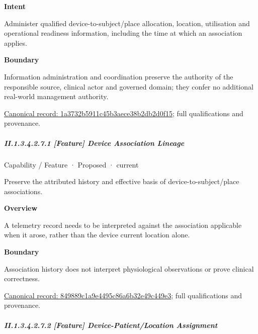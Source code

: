 \textbf{Intent}



Administer qualified device-to-subject/place allocation, location, utilisation and operational readiness information, including the time at which an association applies.



\textbf{Boundary}



Information administration and coordination preserve the authority of the responsible source, clinical actor and governed domain; they confer no additional real-world management authority.


{\footnotesize \href{../../../../../../../continuum/strategy/capability/1a3732b5911c45b3aece38b2db2d0f15.md}{Canonical record: 1a3732b5911c45b3aece38b2db2d0f15}; full qualifications and provenance.}\par
\subparagraph*{II.1.3.4.2.7.1 [Feature] Device Association Lineage}
\label{navigation:II.1.3.4.2.7.1}

\label{element:849889c1a9e4495c86a6b32e49c449e3}
{\small Capability / Feature · Proposed · current}\par

Preserve the attributed history and effective basis of device-to-subject/place associations.



\textbf{Overview}



A telemetry record needs to be interpreted against the association applicable when it arose, rather than the device current location alone.



\textbf{Boundary}



Association history does not interpret physiological observations or prove clinical correctness.


{\footnotesize \href{../../../../../../../continuum/strategy/capability/feature/849889c1a9e4495c86a6b32e49c449e3.md}{Canonical record: 849889c1a9e4495c86a6b32e49c449e3}; full qualifications and provenance.}\par
\subparagraph*{II.1.3.4.2.7.2 [Feature] Device-Patient/Location Assignment}
\label{navigation:II.1.3.4.2.7.2}

